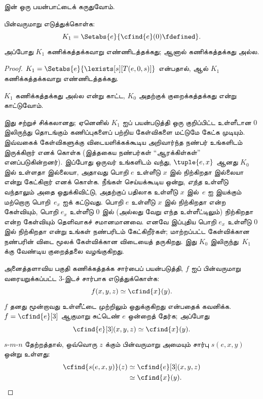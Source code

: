 \documentclass[../../../include/open-logic-section]{subfiles}
\begin{document}


 இன் ஒரு பயன்பாட்டைக் கருதுவோம்.

\begin{prop}
பின்வருமாறு எடுத்துக்கொள்க:
\[
K_1 = \Setabs{e}{\cfind{e}(0) \fdefined}.
\]
அப்போது $K_1$ கணிக்கத்தக்கவாறு எண்ணிடத்தக்கது; ஆனால் கணிக்கத்தக்கது அல்ல.
\end{prop}

\begin{proof}
$K_1 = \Setabs{e}{\lexists[s][T(e,0,s)]}$ என்பதால்,
 ஆல் $K_1$ கணிக்கத்தக்கவாறு எண்ணிடத்தக்கது.

$K_1$ கணிக்கத்தக்கது அல்ல என்று காட்ட, $K_0$ அதற்குக்
குறைக்கத்தக்கது என்று காட்டுவோம்.

\begin{explain}
இது சற்றுச் சிக்கலானது; ஏனெனில் $K_1$ ஐப் பயன்படுத்தி ஒரு குறிப்பிட்ட
உள்ளீடான $0$ இலிருந்து தொடங்கும் கணிப்புகளைப் பற்றிய கேள்விகளை
மட்டுமே கேட்க முடியும். இவ்வகைக் கேள்விகளுக்கு விடையளிக்கக்கூடிய
அறிவார்ந்த நண்பர் உங்களிடம் இருக்கிறார் எனக் கொள்க (இத்தகைய நண்பர்கள்
``ஆரக்கிள்கள்'' எனப்படுகின்றனர்). இப்போது ஒருவர் உங்களிடம் வந்து,
$\tuple{e, x}$ ஆனது $K_0$ இல் உள்ளதா இல்லையா, அதாவது பொறி $e$
உள்ளீடு $x$ இல் நிற்கிறதா இல்லையா என்று கேட்கிறார் எனக் கொள்க.
நீங்கள் செய்யக்கூடிய ஒன்று, \emph{எந்த} உள்ளீடு வந்தாலும் அதை
ஒதுக்கிவிட்டு, அதற்குப் பதிலாக உள்ளீடு $x$ இல்~$e$ ஐ இயக்கும்
மற்றொரு பொறி~$e_x$ ஐக் கட்டுவது. பொறி $e$ உள்ளீடு $x$ இல்
நிற்கிறதா என்ற கேள்வியும், பொறி $e_x$ உள்ளீடு $0$ இல்
(அல்லது வேறு எந்த உள்ளீட்டிலும்) நிற்கிறதா என்ற கேள்வியும்
தெளிவாகச் சமானமானவை. எனவே இப்புதிய பொறி $e_x$ உள்ளீடு $0$ இல்
நிற்கிறதா என்று உங்கள் நண்பரிடம் கேட்கிறீர்கள்; மாற்றப்பட்ட
கேள்விக்கான நண்பரின் விடை மூலக் கேள்விக்கான விடையைத் தருகிறது.
இது $K_0$ இலிருந்து~$K_1$ க்கு வேண்டிய குறைத்தலை வழங்குகிறது.
\end{explain}

அனைத்தளாவிய பகுதி கணிக்கத்தக்க சார்பைப் பயன்படுத்தி,
$f$ ஐப் பின்வருமாறு வரையறுக்கப்பட்ட 3-இடச் சார்பாக எடுத்துக்கொள்க:
\[
f(x,y,z) \simeq \cfind{x}(y).
\]
$f$ தனது மூன்றாவது உள்ளீட்டை முற்றிலும் ஒதுக்குகிறது என்பதைக்
கவனிக்க. $f = \cfind{e}[3]$ ஆகுமாறு சுட்டெண் $e$ ஒன்றைத் தேர்க;
அப்போது
\[
\cfind{e}[3](x,y,z) \simeq \cfind{x}(y).
\]
$s$-$m$-$n$ தேற்றத்தால், ஒவ்வொரு $z$ க்கும் பின்வருமாறு அமையும்
சார்பு $s(e,x,y)$ ஒன்று உள்ளது:
\begin{align*}
\cfind{s(e,x,y)}(z) & \simeq \cfind{e}[3](x,y,z) \\
& \simeq \cfind{x}(y).
\end{align*}


\end{proof}
\end{document}
